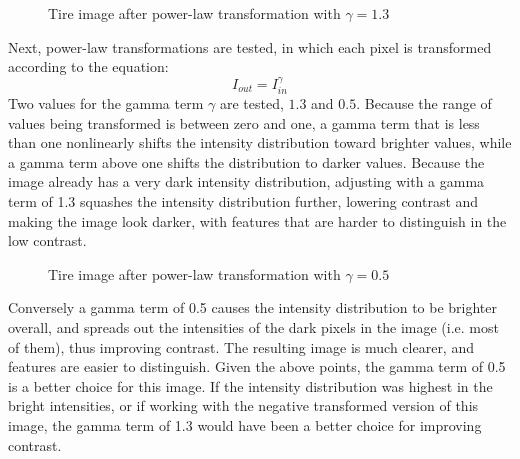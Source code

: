 \documentclass{sydeStyle}
\begin{document}
 \begin{figure}
	\begin{center}
	\end{center}
	\caption{Tire image after power-law transformation with $\gamma=1.3$}
\end{figure}
Next, power-law transformations are tested, in which each pixel is transformed
according to the equation:
\begin{displaymath}
	I_{out} = I_{in}^\gamma
\end{displaymath}
Two values for the gamma term $\gamma$ are tested, $1.3$ and $0.5$.
Because the range of values being transformed is between zero and one, a gamma
term that is less than one nonlinearly shifts the intensity distribution toward
brighter values, while a gamma term above one shifts the distribution to darker
values.
Because the image already has a very dark intensity distribution, adjusting with
a gamma term of 1.3 squashes the intensity distribution further, lowering
contrast and making the image look darker, with features that are harder to
distinguish in the low contrast.
 \begin{figure}
	\begin{center}
	\end{center}
	\caption{Tire image after power-law transformation with $\gamma=0.5$}
\end{figure}
Conversely a gamma term of 0.5 causes the intensity distribution to be brighter
overall, and spreads out the intensities of the dark pixels in the image (i.e.
most of them), thus improving contrast.
The resulting image is much clearer, and features are easier to distinguish.
Given the above points, the gamma term of 0.5 is a better choice for this image.
If the intensity distribution was highest in the bright intensities, or if
working with the negative transformed version of this image, the gamma term of
1.3 would have been a better choice for improving contrast.
\end{document}
